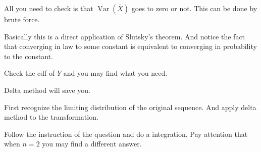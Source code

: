 \documentclass[12pt]{article}
\newcommand{\1}{\mathbbm{1}}
\newenvironment{exercise}[2][Exercise]{\begin{trivlist}
\item[\hskip \labelsep {\bfseries #1}\hskip \labelsep {\bfseries #2.}]}{\end{trivlist}}
\newcommand{\var}[1]{\operatorname{Var}\left(#1\right)}
\begin{document}
All you need to check is that $\var {\bar{X}}$ goes to zero or not. This can be done by brute force.

\begin{exercise}{8.12}
\end{exercise}

Basically this is a direct application of Slutsky's theorem. And notice the fact that converging in law to some constant is equivalent to converging in probability to the constant.

\begin{exercise}{8.13}
\end{exercise}

Check the cdf of $Y$ and you may find what you need.

\begin{exercise}{8.15/16}
\end{exercise}

Delta method will save you.

\begin{exercise}{8.17}
\end{exercise}

First recognize the limiting distribution of the original sequence. And apply delta method to the transformation.

\begin{exercise}{8.18}
\end{exercise}

Follow the instruction of the question and do a integration. Pay attention that when $n=2$ you may find a different answer.

\end{document}
